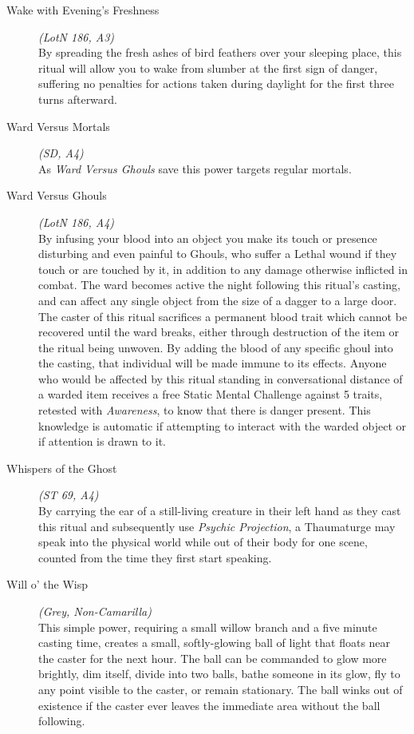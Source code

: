 \begin{description}
	\item[Wake with Evening's Freshness] \emph{(LotN 186, A3)} \hfill \\
	By spreading the fresh ashes of bird feathers over your sleeping place, this ritual will allow you to wake from slumber at the first 
	sign of danger, suffering no penalties for actions taken during daylight for the first three turns afterward. \\

	\item[Ward Versus Mortals] \emph{(SD, A4)} \hfill \\
	As \emph{Ward Versus Ghouls} save this power targets regular mortals. \\
	
	\item[Ward Versus Ghouls] \emph{(LotN 186, A4)} \hfill \\
	By infusing your blood into an object you make its touch or presence disturbing and even painful to Ghouls, who suffer a Lethal 
	wound if they touch or are touched by it, in addition to any damage otherwise inflicted in combat.  The ward becomes active the 
	night following this ritual's casting, and can affect any single object from the size of a dagger to a large door.  The caster of this 
	ritual sacrifices a permanent blood trait which cannot be recovered until the ward breaks, either through destruction of the 
	item or the ritual being unwoven.  By adding the blood of any specific ghoul into the casting, that individual will be made 
	immune to its effects.  Anyone who would be affected by this ritual standing in conversational distance of a warded item 
	receives a free Static Mental Challenge against 5 traits, retested with \emph{Awareness}, to know that there is danger present.  
	This knowledge is automatic if attempting to interact with the warded object or if attention is drawn to it. \\

	\item[Whispers of the Ghost] \emph{(ST 69, A4)} \hfill \\
	By carrying the ear of a still-living creature in their left hand as they cast this ritual and subsequently use 
	\emph{Psychic Projection}, a Thaumaturge may speak into the physical world while out of their body for one scene, counted from 
	the time they first start speaking. \\

	\item[Will o' the Wisp] \emph{(Grey, Non-Camarilla)} \hfill \\
	This simple power, requiring a small willow branch and a five minute casting time, creates a small, softly-glowing ball of light 
	that floats near the caster for the next hour.  The ball can be commanded to glow more brightly, dim itself, divide into two 
	balls, bathe someone in its glow, fly to any point visible to the caster, or remain stationary.  The ball winks out of 
	existence if the caster ever leaves the immediate area without the ball following. \\

\end{description}


